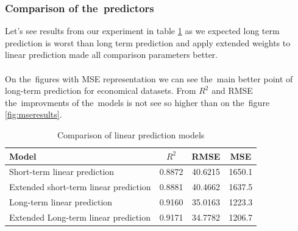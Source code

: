     \subsubsection{Comparison of the~predictors} \label{subsec:res_comparison}
    Let's see results from our experiment in table \ref{tab:model_comparison} as we expected
    long term prediction is worst than long term prediction and apply extended weights to
    linear prediction made all comparison parameters better.\\
    \\
    On the~figures with MSE representation we can see the~main better point of long-term
    prediction for economical datasets. From $R^2$ and RMSE the~improvments of the~models is not
    see so higher than on the~figure \ref{fig:mseresults}.\\
    \newpage
    \begin{table}[!ht]
        \centering
        \begin{tabular}{|l|c|c|c|}
            \hline
            Model & $R^2$ & RMSE & MSE \\
            \hline
            Short-term linear prediction & 0.8872 & 40.6215 & 1650.1 \\
            Extended short-term linear prediction & 0.8881 & 40.4662 & 1637.5 \\
            Long-term linear prediction & 0.9160 & 35.0163 & 1223.3 \\
            Extended Long-term linear prediction & 0.9171 & 34.7782 & 1206.7 \\
            \hline
        \end{tabular}
        \caption{Comparison of linear prediction models}
        \label{tab:model_comparison}
    \end{table}

